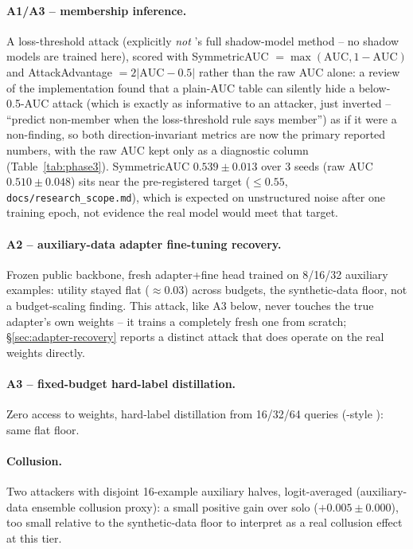 \documentclass[11pt]{article}
\begin{document}
\paragraph{A1/A3 -- membership inference.} A loss-threshold attack
(explicitly \emph{not} \citeauthor{shokri2017membership}'s full
shadow-model method \citep{shokri2017membership} -- no shadow models are
trained here), scored with SymmetricAUC $=\max(\text{AUC}, 1-\text{AUC})$
and AttackAdvantage $=2|\text{AUC}-0.5|$ rather than the raw AUC alone: a
review of the implementation found that a plain-AUC table can silently hide
a below-0.5-AUC attack (which is exactly as informative to an attacker,
just inverted -- ``predict non-member when the loss-threshold rule says
member'') as if it were a non-finding, so both direction-invariant metrics
are now the primary reported numbers, with the raw AUC kept only as a
diagnostic column (Table~\ref{tab:phase3}). SymmetricAUC $0.539 \pm 0.013$
over 3 seeds (raw AUC $0.510 \pm 0.048$) sits near the pre-registered target
($\le 0.55$, \texttt{docs/research\_scope.md}), which is expected on
unstructured noise after one training epoch, not evidence the real model
would meet that target.

\paragraph{A2 -- auxiliary-data adapter fine-tuning recovery.} Frozen public
backbone, fresh adapter+fine head trained on 8/16/32 auxiliary examples:
utility stayed flat ($\approx 0.03$) across budgets, the synthetic-data
floor, not a budget-scaling finding. This attack, like A3 below, never
touches the true adapter's own weights -- it trains a completely fresh one
from scratch; \S\ref{sec:adapter-recovery} reports a distinct attack that
does operate on the real weights directly.

\paragraph{A3 -- fixed-budget hard-label distillation.} Zero access to
weights, hard-label distillation from 16/32/64 queries
(\citeauthor{tramer2016stealing}-style \citep{tramer2016stealing}): same
flat floor.

\paragraph{Collusion.} Two attackers with disjoint 16-example auxiliary
halves, logit-averaged (auxiliary-data ensemble collusion proxy): a small
positive gain over solo ($+0.005 \pm 0.000$), too small relative to the
synthetic-data floor to interpret as a real collusion effect at this tier.
\end{document}
